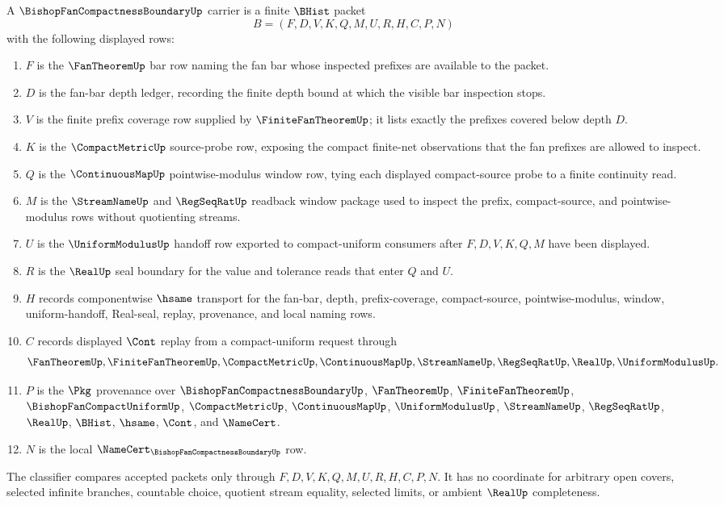 \begin{definition}
\label{def:bishop-fan-compactness-boundary-carrier}
A $\BishopFanCompactnessBoundaryUp$ carrier is a finite $\BHist$ packet
$$
B=(F,D,V,K,Q,M,U,R,H,C,P,N)
$$
with the following displayed rows:
\begin{enumerate}
\item $F$ is the $\FanTheoremUp$ bar row naming the fan bar whose inspected prefixes are available to the packet.
\item $D$ is the fan-bar depth ledger, recording the finite depth bound at which the visible bar inspection stops.
\item $V$ is the finite prefix coverage row supplied by $\FiniteFanTheoremUp$; it lists exactly the prefixes covered below depth $D$.
\item $K$ is the $\CompactMetricUp$ source-probe row, exposing the compact finite-net observations that the fan prefixes are allowed to inspect.
\item $Q$ is the $\ContinuousMapUp$ pointwise-modulus window row, tying each displayed compact-source probe to a finite continuity read.
\item $M$ is the $\StreamNameUp$ and $\RegSeqRatUp$ readback window package used to inspect the prefix, compact-source, and pointwise-modulus rows without quotienting streams.
\item $U$ is the $\UniformModulusUp$ handoff row exported to compact-uniform consumers after $F,D,V,K,Q,M$ have been displayed.
\item $R$ is the $\RealUp$ seal boundary for the value and tolerance reads that enter $Q$ and $U$.
\item $H$ records componentwise $\hsame$ transport for the fan-bar, depth, prefix-coverage, compact-source, pointwise-modulus, window, uniform-handoff, Real-seal, replay, provenance, and local naming rows.
\item $C$ records displayed $\Cont$ replay from a compact-uniform request through
$$
\FanTheoremUp,\FiniteFanTheoremUp,\CompactMetricUp,\ContinuousMapUp,\StreamNameUp,\RegSeqRatUp,\RealUp,\UniformModulusUp .
$$
\item $P$ is the $\Pkg$ provenance over $\BishopFanCompactnessBoundaryUp$, $\FanTheoremUp$, $\FiniteFanTheoremUp$, $\BishopFanCompactUniformUp$, $\CompactMetricUp$, $\ContinuousMapUp$, $\UniformModulusUp$, $\StreamNameUp$, $\RegSeqRatUp$, $\RealUp$, $\BHist$, $\hsame$, $\Cont$, and $\NameCert$.
\item $N$ is the local $\NameCert_{\BishopFanCompactnessBoundaryUp}$ row.
\end{enumerate}
The classifier compares accepted packets only through $F,D,V,K,Q,M,U,R,H,C,P,N$. It has no coordinate for arbitrary open covers, selected infinite branches, countable choice, quotient stream equality, selected limits, or ambient $\RealUp$ completeness.
\end{definition}

